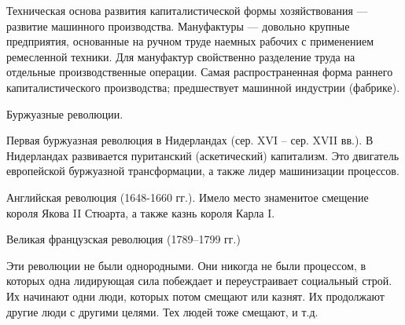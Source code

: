 Техническая основа развития капиталистической формы хозяйствования --- развитие
машинного производства. Мануфактуры --- довольно крупные предприятия,
основанные на ручном труде наемных рабочих с применением ремесленной техники. Для мануфактур свойственно разделение труда на отдельные производственные операции. Самая распространенная форма раннего капиталистического производства;
предшествует машинной индустрии (фабрике).




Буржуазные революции.

Первая буржуазная революция в Нидерландах (сер. XVI – сер. XVII вв.). 
В Нидерландах развивается пуританский (аскетический) капитализм. Это двигатель европейской буржуазной трансформации, а также лидер машинизации процессов. 


Английская революция (1648-1660 гг.).
Имело место знаменитое смещение короля Якова II Стюарта, а также казнь короля Карла I. 


Великая французская революция (1789–1799 гг.)

Эти революции не были однородными. Они никогда не были процессом, в которых одна лидирующая сила побеждает и переустраивает социальный строй. Их начинают одни люди, которых потом смещают или казнят. Их продолжают другие
люди с другими целями. Тех людей тоже смещают, и т.д.

